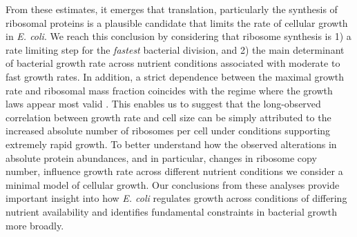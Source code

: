 
From these estimates, it emerges that translation,  particularly the synthesis of ribosomal proteins is a
plausible candidate that limits the rate of cellular growth in \textit{E. coli}.
We reach this conclusion by considering that ribosome synthesis is 1) a rate
limiting step for the \textit{fastest} bacterial division, and  2) the main
determinant of bacterial growth rate across  nutrient conditions associated with
moderate to fast growth rates. In addition, a strict dependence between the
maximal growth rate and ribosomal mass fraction coincides with the regime where
the growth laws appear most valid \citep{amir2017, scott2010}. This enables us
to suggest that the long-observed correlation between growth rate and cell size
\citep{schaechter1958, si2017} can be simply attributed to the increased
absolute number of ribosomes per cell under conditions supporting extremely
rapid growth. To better understand how the observed alterations in absolute
protein abundances, and in particular, changes in ribosome copy number,
influence growth rate across different nutrient conditions we consider a minimal
model of cellular growth. Our conclusions from these analyses provide important
insight into how \textit{E. coli} regulates growth across conditions of
differing nutrient availability and identifies fundamental constraints in
bacterial growth more broadly.






\begin{figure}
\end{figure}
